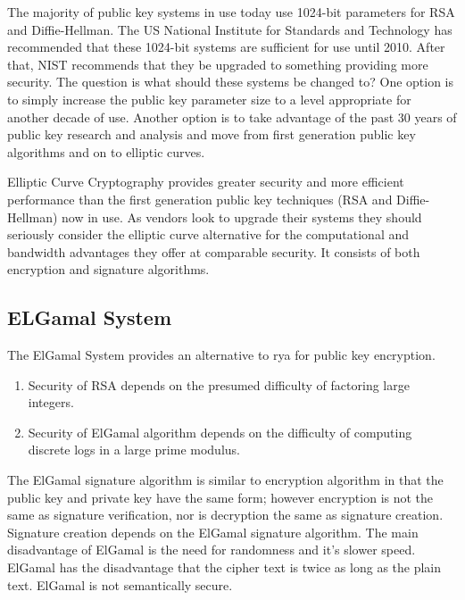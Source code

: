 \documentclass[12pt,journal,compsoc]{IEEEtran}
\begin{document}
The majority of public key systems in use today use 1024-bit parameters for RSA and Diffie-Hellman. The US National Institute for Standards and Technology has recommended that these 1024-bit systems are sufficient for use until 2010. After that, NIST recommends that they be upgraded to something providing more security. The question is what should these systems be changed to? One option is to simply increase the public key parameter size to a level appropriate for another decade of use. Another option is to take advantage of the past 30 years of public key research and analysis and move from first generation public key algorithms and on to elliptic curves.

Elliptic Curve Cryptography provides greater security and more efficient performance than the first generation public key techniques (RSA and Diffie-Hellman) now in use. As vendors look to upgrade their systems they should seriously consider the elliptic curve alternative for the computational and bandwidth advantages they offer at comparable security. It consists of both encryption and signature algorithms. 

\subsection{{ELGamal System}}
The ElGamal System \cite{elgamal} provides an alternative to rya for public key encryption.
\begin{enumerate}
	\item Security of RSA depends on the presumed difficulty of factoring large integers.
	\item Security of ElGamal algorithm depends on the difficulty of computing discrete logs in a large prime modulus.
\end{enumerate}
The ElGamal signature algorithm is similar to encryption algorithm in that the public key and private key have the same form; however encryption is not the same as signature verification, nor is decryption the same as signature creation. Signature creation depends on the ElGamal signature algorithm. The main disadvantage of ElGamal is the need for randomness and it's slower speed.  ElGamal has the disadvantage that the cipher text is twice as long as the plain text. ElGamal is not semantically secure.
\end{document}
